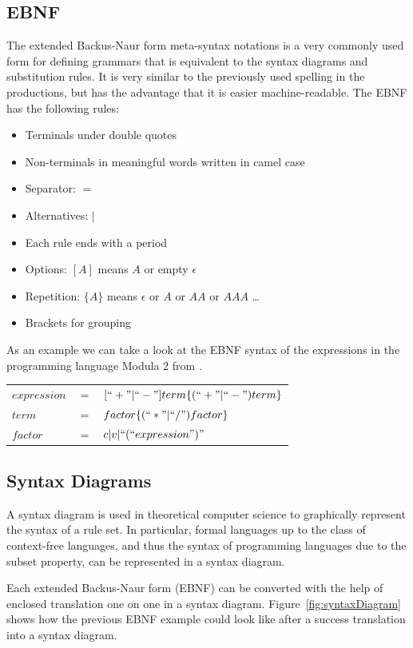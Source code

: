\subsection{EBNF}
The extended Backus-Naur form meta-syntax notations is a very commonly used form for defining grammars that is equivalent to the syntax diagrams and substitution rules. It is very similar to the previously used spelling in the productions, but has the advantage that it is easier machine-readable.
The EBNF has the following rules:
\begin{itemize}
\item Terminals under double quotes
\item Non-terminals in meaningful words written in camel case
\item Separator: $=$ 
\item Alternatives: $|$
\item Each rule ends with a period 
\item Options: $[A]$ means $A$ or empty $\epsilon$
\item Repetition: $\{A\}$ means $\epsilon$ or $A$ or $AA$ or $AAA$ \ldots
\item Brackets for grouping
\end{itemize}
As an example we can take a look at the EBNF syntax of the expressions in the programming language Modula 2 from \cite{rechenberg_compiler-generator_1988}.

\begin{tabular}{lll}
$expression$ & $=$ & $ [``+" |``-"] term \{(``+" |``-") term\}$\\
$term$ & $=$ & $factor \{(``*" |``/") factor\}$ \\
$factor$ & $=$ & $c |v |``(`` expression ")"$ \\
\end{tabular}

\subsection{Syntax Diagrams}
A syntax diagram is used in theoretical computer science to graphically represent the syntax of a rule set. In particular, formal languages up to the class of context-free languages, and thus the syntax of programming languages due to the subset property, can be represented in a syntax diagram.

Each extended Backus-Naur form (EBNF) can be converted with the help of enclosed translation one on one in a syntax diagram.
Figure~\ref{fig:syntaxDiagram} shows how the previous EBNF example could look like after a success translation into a syntax diagram.

